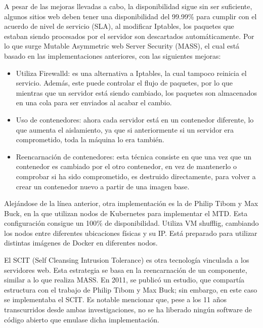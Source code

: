 A pesar de las mejoras llevadas a cabo, la disponibilidad sigue sin ser suficiente, algunos sitios web deben tener una disponibilidad del 99.99\% para cumplir con el acuerdo de nivel de servicio (SLA)\cite{SLA}, al modificar Iptables, los paquetes que estaban siendo procesados por el servidor son descartados automáticamente. Por lo que surge Mutable Asymmetric web Server Security (MASS), el cual está basado en las implementaciones anteriores, con las siguientes mejoras:
\begin{itemize}
    \item Utiliza Firewalld\cite{firewalld}: es una alternativa a Iptables, la cual tampoco reinicia el servicio. Además, este puede controlar el flujo de paquetes, por lo que mientras que un servidor está siendo cambiado, los paquetes son almacenados en una cola para ser enviados al acabar el cambio.
    \item Uso de contenedores: ahora cada servidor está en un contenedor diferente, lo que aumenta el aislamiento, ya que si anteriormente si un servidor era comprometido, toda la máquina lo era también.
    \item Reencarnación de contenedores: esta técnica consiste en que una vez que un contenedor es cambiado por el otro contenedor, en vez de mantenerlo o comprobar si ha sido comprometido, es destruido directamente, para volver a crear un contenedor nuevo a partir de una imagen base.
\end{itemize}

Alejándose de la línea anterior, otra implementación es la de Philip Tibom y Max Buck\cite{MTD-gotemburgo}, en la que utilizan nodos de Kubernetes\cite{kubernetes} para implementar el MTD. Esta configuración consigue un 100\% de disponibilidad. Utiliza VM shufflig, cambiando los nodos entre diferentes ubicaciones físicas y su IP. Está preparado para utilizar distintas imágenes de Docker en diferentes nodos.

El SCIT (Self Cleansing Intrusion Tolerance)\cite{SCIT-base} es otra tecnología vinculada a los servidores web. Esta estrategia se basa en la reencarnación de un componente, similar a lo que realiza MASS. En 2011, se publicó un estudio\cite{SCIT-cloud}, que compartía estructura con el trabajo de Philip Tibom y Max Buck; sin embargo, en este caso se implementaba el SCIT. Es notable mencionar que, pese a los 11 años transcurridos desde ambas investigaciones, no se ha liberado ningún software de código abierto que emulase dicha implementación.


